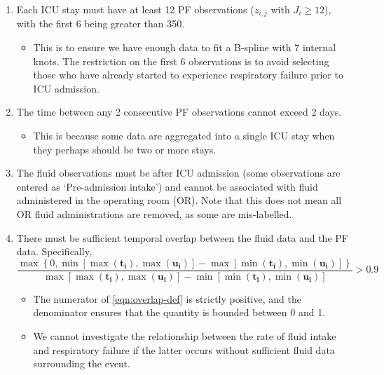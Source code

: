 \documentclass[
  10pt,
  a4paper,
]{article}
\providecommand{\tightlist}{%
  \setlength{\itemsep}{0pt}\setlength{\parskip}{0pt}}
\begin{document}
\begin{enumerate}
\def\labelenumi{\arabic{enumi}.}
\tightlist
\item
  Each ICU stay must have at least 12 PF observations (\(z_{i, j}\) with
  \(J_{i} \geq 12\)), with the first 6 being greater than 350.

  \begin{itemize}
  \tightlist
  \item
    This is to ensure we have enough data to fit a B-spline with 7
    internal knots. The restriction on the first 6 observations is to
    avoid selecting those who have already started to experience
    respiratory failure prior to ICU admission.
  \end{itemize}
\item
  The time between any 2 consecutive PF observations cannot exceed 2
  days.

  \begin{itemize}
  \tightlist
  \item
    This is because some data are aggregated into a single ICU stay when
    they perhaps should be two or more stays.
  \end{itemize}
\item
  The fluid observations must be after ICU admission (some observations
  are entered as `Pre-admission intake') and cannot be associated with
  fluid administered in the operating room (OR). Note that this does not
  mean all OR fluid administrations are removed, as some are
  mis-labelled.
\item
  There must be sufficient temporal overlap between the fluid data and
  the PF data. Specifically, \begin{equation}
   \frac{
     \max\left\{0, \min\left[\max(\boldsymbol{t_{i}}), \max(\boldsymbol{u_{i}})\right] - \max\left[\min(\boldsymbol{t_{i}}), \min(\boldsymbol{u_{i}})\right]\right\}
   } {
     \max\left[\max(\boldsymbol{t_{i}}), \max(\boldsymbol{u_{i}})\right] - \min\left[\min(\boldsymbol{t_{i}}), \min(\boldsymbol{u_{i}})\right]
   }
   > 0.9
   \label{eqn:overlap-def}
    \end{equation}

  \begin{itemize}
  \tightlist
  \item
    The numerator of \eqref{eqn:overlap-def} is strictly positive, and
    the denominator ensures that the quantity is bounded between 0 and
    1.
  \item
    We cannot investigate the relationship between the rate of fluid
    intake and respiratory failure if the latter occurs without
    sufficient fluid data surrounding the event.
  \end{itemize}
\end{enumerate}
\end{document}
